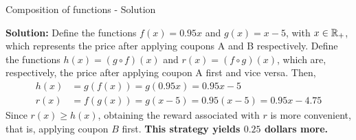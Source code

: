 \documentclass[9pt]{beamer}
\begin{document}
\begin{frame}{Composition of functions - Solution}

    \textbf{Solution:} Define the functions $f(x) = 0.95 x$ and $g(x) = x - 5$, with $x \in \mathbb{R}_+$, which represents the price after applying coupons A and B respectively. Define the functions $h(x) = (g\circ f)(x)$ and $r(x) = (f\circ g)(x)$, which are, respectively, the price after applying coupon A first and vice versa. Then,
    \begin{align*}
        h(x) &= g(f(x)) = g(0.95x) = 0.95x - 5 \\
        r(x) &= f(g(x)) = g(x - 5) = 0.95(x - 5) = 0.95x - 4.75
    \end{align*}
    Since $r(x) \geq h(x)$, obtaining the reward associated with $r$ is more convenient, that is, applying coupon $B$ first. \textbf{This strategy yields $\pmb{0.25}$ dollars more.}
        
\end{frame}
\end{document}
